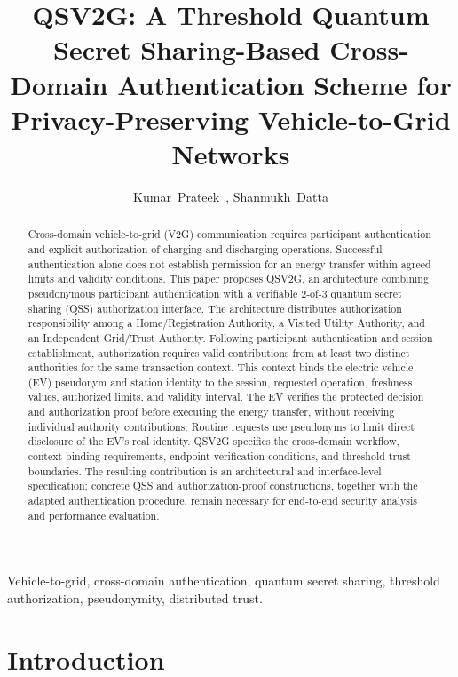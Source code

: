 \documentclass[twocolumn,10pt,journal]{IEEEtran}
\begin{document}
\title{QSV2G: A Threshold Quantum Secret Sharing-Based Cross-Domain Authentication Scheme for Privacy-Preserving Vehicle-to-Grid Networks}
\author{Kumar~Prateek~,
Shanmukh~Datta }
\maketitle

\begin{abstract}
Cross-domain vehicle-to-grid (V2G) communication requires participant authentication and explicit authorization of charging and discharging operations. Successful authentication alone does not establish permission for an energy transfer within agreed limits and validity conditions. This paper proposes QSV2G, an architecture combining pseudonymous participant authentication with a verifiable 2-of-3 quantum secret sharing (QSS) authorization interface. The architecture distributes authorization responsibility among a Home/Registration Authority, a Visited Utility Authority, and an Independent Grid/Trust Authority. Following participant authentication and session establishment, authorization requires valid contributions from at least two distinct authorities for the same transaction context. This context binds the electric vehicle (EV) pseudonym and station identity to the session, requested operation, freshness values, authorized limits, and validity interval. The EV verifies the protected decision and authorization proof before executing the energy transfer, without receiving individual authority contributions. Routine requests use pseudonyms to limit direct disclosure of the EV's real identity. QSV2G specifies the cross-domain workflow, context-binding requirements, endpoint verification conditions, and threshold trust boundaries. The resulting contribution is an architectural and interface-level specification; concrete QSS and authorization-proof constructions, together with the adapted authentication procedure, remain necessary for end-to-end security analysis and performance evaluation.
\end{abstract}

\begin{IEEEkeywords}
Vehicle-to-grid, cross-domain authentication, quantum secret sharing, threshold authorization, pseudonymity, distributed trust.
\end{IEEEkeywords}

\section{Introduction}
\label{sec:qsv2g_introduction}
\end{document}
